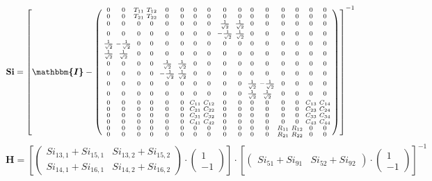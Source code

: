 \[ \mathbf{Si} = \left[ \boldsymbol{\mathbbm{I}}  -
\left(\begin{smallmatrix} 0 & 0 & T_{11} & T_{12} & 0 & 0 & 0 & 0 & 0
& 0 & 0 & 0 & 0 & 0 & 0 & 0 \\ 0 & 0 & T_{21} & T_{22} & 0 & 0 & 0 & 0
& 0 & 0 & 0 & 0 & 0 & 0 & 0 & 0 \\ 0 & 0 & 0 & 0 & 0 & 0 & 0 & 0 &
\frac{1}{\sqrt{2}} & \frac{1}{\sqrt{2}} & 0 & 0 & 0 & 0 & 0 & 0 \\ 0 &
0 & 0 & 0 & 0 & 0 & 0 & 0 & -\frac{1}{\sqrt{2}} & \frac{1}{\sqrt{2}} &
0 & 0 & 0 & 0 & 0 & 0 \\ \frac{1}{\sqrt{2}} & -\frac{1}{\sqrt{2}} & 0
& 0 & 0 & 0 & 0 & 0 & 0 & 0 & 0 & 0 & 0 & 0 & 0 & 0 \\
\frac{1}{\sqrt{2}} & \frac{1}{\sqrt{2}} & 0 & 0 & 0 & 0 & 0 & 0 & 0 &
0 & 0 & 0 & 0 & 0 & 0 & 0 \\ 0 & 0 & 0 & 0 & \frac{1}{\sqrt{2}} &
\frac{1}{\sqrt{2}} & 0 & 0 & 0 & 0 & 0 & 0 & 0 & 0 & 0 & 0 \\ 0 & 0 &
0 & 0 & -\frac{1}{\sqrt{2}} & \frac{1}{\sqrt{2}} & 0 & 0 & 0 & 0 & 0 &
0 & 0 & 0 & 0 & 0 \\ 0 & 0 & 0 & 0 & 0 & 0 & 0 & 0 & 0 & 0 &
\frac{1}{\sqrt{2}} & -\frac{1}{\sqrt{2}} & 0 & 0 & 0 & 0 \\ 0 & 0 & 0
& 0 & 0 & 0 & 0 & 0 & 0 & 0 & \frac{1}{\sqrt{2}} & \frac{1}{\sqrt{2}}
& 0 & 0 & 0 & 0 \\ 0 & 0 & 0 & 0 & 0 & 0 & C_{11} & C_{12} & 0 & 0 & 0
& 0 & 0 & 0 & C_{13} & C_{14} \\ 0 & 0 & 0 & 0 & 0 & 0 & C_{21} &
C_{22} & 0 & 0 & 0 & 0 & 0 & 0 & C_{23} & C_{24} \\ 0 & 0 & 0 & 0 & 0
& 0 & C_{31} & C_{32} & 0 & 0 & 0 & 0 & 0 & 0 & C_{33} & C_{34} \\ 0 &
0 & 0 & 0 & 0 & 0 & C_{41} & C_{42} & 0 & 0 & 0 & 0 & 0 & 0 & C_{43} &
C_{44} \\ 0 & 0 & 0 & 0 & 0 & 0 & 0 & 0 & 0 & 0 & 0 & 0 & R_{11} &
R_{12} & 0 & 0 \\ 0 & 0 & 0 & 0 & 0 & 0 & 0 & 0 & 0 & 0 & 0 & 0 &
R_{21} & R_{22} & 0 & 0 \end{smallmatrix}\right) \right]^{-1} \]
\[ \mathbf{H} = \left[ \left(\begin{smallmatrix} Si_{13,1} + Si_{15,1}
& Si_{13,2} + Si_{15,2} \\ Si_{14,1} + Si_{16,1} & Si_{14,2} +
Si_{16,2} \end{smallmatrix}\right)\cdot \left(\begin{smallmatrix} 1 \\
-1 \end{smallmatrix}\right)\right]\cdot\left[
\left(\begin{smallmatrix} Si_{51} + Si_{91} & Si_{52} + Si_{92}
\end{smallmatrix}\right)\cdot \left(\begin{smallmatrix} 1 \\ -1
\end{smallmatrix}\right)\right]^{-1} \]
